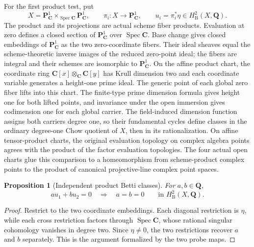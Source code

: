 \documentclass[11pt]{article}
\newtheorem{proposition}[theorem]{Proposition}
\theoremstyle{definition}
\theoremstyle{remark}
\newcommand{\Q}{\mathbf Q}
\begin{document}
For the first product test, put
\[
  X=\mathbf P^1_{\mathbf C}\times_{\operatorname{Spec}\mathbf C}\mathbf P^1_{\mathbf C},
  \qquad \pi_i:X\longrightarrow\mathbf P^1_{\mathbf C},\qquad
  u_i=\pi_i^*\eta\in H^2_{\mathrm B}(X,\Q).
\]
The product and its projections are actual scheme fiber products. Evaluation
at zero defines a closed section of \(\mathbf P^1_{\mathbf C}\) over
\(\operatorname{Spec}\mathbf C\). Base change gives closed embeddings of
\(\mathbf P^1_{\mathbf C}\) as the two zero-coordinate fibers. Their ideal sheaves
equal the scheme-theoretic inverse images of the reduced zero-point ideal;
the fibers are integral and their schemes are isomorphic to
\(\mathbf P^1_{\mathbf C}\). On the affine product chart, the coordinate ring
\(\mathbf C[x]\otimes_{\mathbf C}\mathbf C[y]\) has Krull dimension two and each coordinate
variable generates a height-one prime ideal.
The generic point of each global zero fiber lifts into this chart. The
finite-type prime dimension formula gives height one for both lifted points,
and invariance under the open immersion gives codimension one for each
global carrier. The field-induced dimension function assigns both carriers
degree one, so their fundamental cycles define classes in the ordinary
degree-one Chow quotient of \(X\), then in its rationalization.
On affine tensor-product charts, the original evaluation topology on complex
algebra points agrees with the product of the factor evaluation topologies.
The four actual open charts glue this comparison to a homeomorphism from
scheme-product complex points to the product of canonical projective-line
complex point spaces.

\begin{proposition}[Independent product Betti classes]
\label{prop:p1-product-independent}
For \(a,b\in\Q\),
\[
  a u_1+b u_2=0\quad\Longrightarrow\quad a=b=0
  \qquad\text{in }H^2_{\mathrm B}(X,\Q).
\]
\end{proposition}
\begin{proof}
Restrict to the two coordinate embeddings. Each diagonal restriction is
\(\eta\), while each cross restriction factors through
\(\operatorname{Spec}\mathbf C\), whose rational singular cohomology vanishes in
degree two. Since \(\eta\ne0\), the two restrictions recover \(a\) and
\(b\) separately. This is the argument formalized by the two probe maps.
\end{proof}
\end{document}
